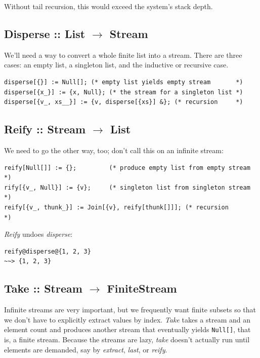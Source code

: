 \documentclass[10pt,oneside,x11names]{article}
\begin{document}
Without tail recursion, this would exceed the system's stack depth.

\subsection{Disperse :: List \(\rightarrow\) Stream}
\label{sec:orgheadline5}

We'll need a way to convert a whole finite list into a stream.  There are three cases: an
empty list, a singleton list, and the inductive or recursive  case.

\begin{verbatim}
disperse[{}] := Null[]; (* empty list yields empty stream       *)
disperse[{x_}] := {x, Null}; (* the stream for a singleton list *)
disperse[{v_, xs__}] := {v, disperse[{xs}] &}; (* recursion     *)
\end{verbatim}

\subsection{Reify :: Stream \(\rightarrow\) List}
\label{sec:orgheadline6}

We need to go the other way, too; don't call this on an infinite stream:

\begin{verbatim}
reify[Null[]] := {};         (* produce empty list from empty stream *)
rify[{v_, Null}] := {v};     (* singleton list from singleton stream *)
reify[{v_, thunk_}] := Join[{v}, reify[thunk[]]]; (* recursion       *)
\end{verbatim}

\noindent \emph{Reify} undoes \emph{disperse}:

\begin{verbatim}
reify@disperse@{1, 2, 3}
~~> {1, 2, 3}
\end{verbatim}

\subsection{Take :: Stream \(\rightarrow\) FiniteStream}
\label{sec:orgheadline7}

Infinite streams are very important, but we frequently want finite subsets so
that we don't have to explicitly extract values by index. \emph{Take} takes a stream
and an element count and produces another stream that eventually yields
\texttt{Null[]}, that is, a finite stream. Because the streams are lazy, \emph{take} doesn't
actually run until elements are demanded, say by \emph{extract}, \emph{last}, or \emph{reify}. 
\end{document}
